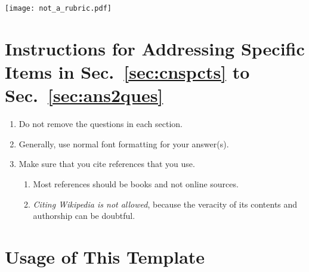 \newpage
\begin{figure*}[!t]
	\texttt{[image: not\_a\_rubric.pdf]} %
\end{figure*}
\cleardoublepage























\appendices

\section{Instructions for Addressing Specific Items in Sec.~\ref{sec:cnspcts} to Sec.~\ref{sec:ans2ques}}

\begin{enumerate}

	\item Do not remove the questions in each section.
	
	\item Generally, use normal font formatting for your answer(s).

	\item Make sure that you cite references that you use. 
		
	\begin{enumerate}
		\item  Most references should be books and not online sources. 
		
		\item \emph{Citing Wikipedia is not allowed}, because the veracity of its contents and authorship can be doubtful.
	\end{enumerate}
	
\end{enumerate}





\section{Usage of This Template}

